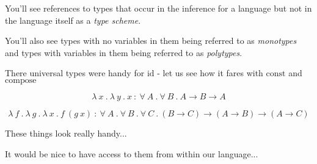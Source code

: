 \begin{frame}
  You'll see references to types that occur in the inference for a language but
  not in the language itself as a {\it type scheme}.
\end{frame}

\begin{frame}
  You'll also see types with no variables in them being referred to as {\it
    monotypes} and types with variables in them being referred to as {\it
    polytypes}.
\end{frame}

\begin{frame}
  There universal types were handy for ${\text{id}}$ - let us see how it fares with $\text{const}$
  and $\text{compose}$
\end{frame}

\begin{frame}
  \[
    \lambda~x~.~\lambda~y~.~x~{:}~\forall~A~.~\forall~B~.~A \rightarrow B \rightarrow A
  \]
\end{frame}

\begin{frame}
  \[
    \lambda~f~.~\lambda~g~.~\lambda~x~.~f~\left( g~x \right)~{:}~\forall~A~.~\forall~B~.~\forall~C~.~\left( B
      \rightarrow C \right) \rightarrow \left( A \rightarrow B \right)
    \rightarrow \left( A \rightarrow C \right)
  \]
\end{frame}

\begin{frame}
  These things look really handy...
\end{frame}

\begin{frame}
  It would be nice to have access to them from within our language...
\end{frame}